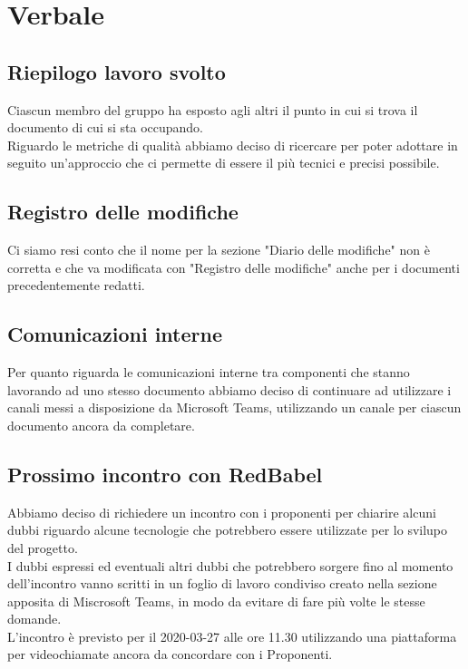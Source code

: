 \section{Verbale}
	
	\subsection{Riepilogo lavoro svolto}
		Ciascun membro del gruppo ha esposto agli altri il punto in cui si trova il documento di cui si sta occupando. \\
		Riguardo le metriche di qualità abbiamo deciso di ricercare per poter adottare in seguito un'approccio che ci permette di essere il più tecnici e precisi possibile.
		
		
	\subsection{Registro delle modifiche}
		Ci siamo resi conto che il nome per la sezione "Diario delle modifiche" non è corretta e che va modificata con "Registro delle modifiche" anche per i documenti precedentemente redatti.

	\subsection{Comunicazioni interne}
		Per quanto riguarda le comunicazioni interne tra componenti che stanno lavorando ad uno stesso documento abbiamo deciso di continuare ad utilizzare i canali messi a disposizione da Microsoft Teams, utilizzando un canale per ciascun documento ancora da completare.
		
	\subsection{Prossimo incontro con RedBabel}
		Abbiamo deciso di richiedere un incontro con i proponenti per chiarire alcuni dubbi riguardo alcune tecnologie che potrebbero essere utilizzate per lo svilupo del progetto. \\
		I dubbi espressi ed eventuali altri dubbi che potrebbero sorgere fino al momento dell'incontro vanno scritti in un foglio di lavoro condiviso creato nella sezione apposita di Miscrosoft Teams, in modo da evitare di fare più volte le stesse domande. \\
		L'incontro è previsto per il 2020-03-27 alle ore 11.30 utilizzando una piattaforma per videochiamate ancora da concordare con i Proponenti.

